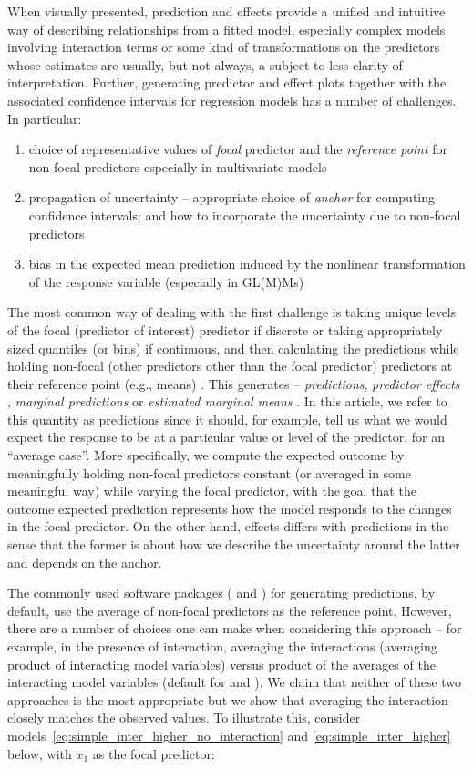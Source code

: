 When visually presented, prediction and effects provide a unified and intuitive way of describing relationships from a fitted model, especially complex models involving interaction terms or some kind of transformations on the predictors whose estimates are usually, but not always, a subject to less clarity of interpretation. Further, generating predictor and effect plots together with the associated confidence intervals for regression models has a number of challenges. In particular:
\begin{enumerate}
\item choice of representative values of \emph{focal} predictor and the \emph{reference point} for non-focal predictors especially in multivariate models
\item  propagation of uncertainty -- appropriate choice of \emph{anchor} for computing confidence intervals; and how to incorporate the uncertainty due to non-focal predictors 
\item bias in the expected mean prediction induced by the nonlinear transformation of the response variable (especially in GL(M)Ms)
\end{enumerate}

The most common way of dealing with the first challenge is taking unique levels of the focal (predictor of interest) predictor if discrete or taking appropriately sized quantiles (or bins) if continuous, and then calculating the predictions while holding non-focal (other predictors other than the focal predictor) predictors at their reference point (e.g., means) \citep{hanmer2013behind}. This generates -- \emph{predictions}, \emph{predictor effects} \citep{fox2009effect}, \emph{marginal predictions} \citep{leeper2017package} or \emph{estimated marginal means} \citep{lenth2018package}. In this article, we refer to this quantity as predictions since it should, for example, tell us what we would expect the response to be at a particular value or level of the predictor, for an ``average case''. More specifically, we compute the expected outcome by meaningfully holding non-focal predictors constant (or averaged in some meaningful way) while varying the focal predictor, with the goal that the outcome expected prediction represents how the model responds to the changes in the focal predictor. On the other hand, effects differs with predictions in the sense that the former is about how we describe the uncertainty around the latter and depends on the anchor. 

The commonly used  software packages ( and ) for generating predictions, by default, use the average of non-focal predictors as the reference point. However, there are a number of choices one can make when considering this approach -- for example, in the presence of interaction, averaging the interactions (averaging product of interacting model variables) versus product of the averages of the interacting model variables (default for  and ). We claim that neither of these two approaches is the most appropriate but we show that averaging the interaction closely matches the observed values. To illustrate this, consider models~\ref{eq:simple_inter_higher_no_interaction} and \ref{eq:simple_inter_higher} below, with $x_1$ as the focal predictor:

